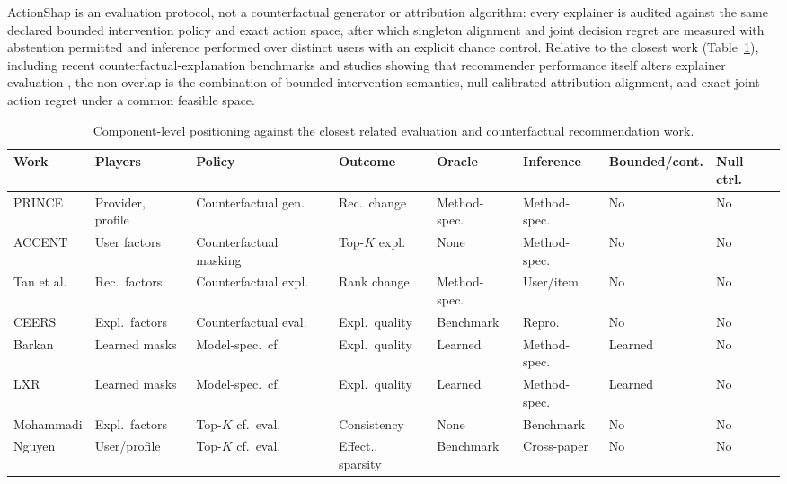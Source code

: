 \documentclass[pdflatex,sn-mathphys-num]{sn-jnl}
\theoremstyle{thmstyleone}
\theoremstyle{thmstyletwo}
\theoremstyle{thmstylethree}
\begin{document}
ActionShap is an evaluation protocol, not a counterfactual generator or attribution algorithm: every explainer is audited against the same declared bounded intervention policy and exact action space, after which singleton alignment and joint decision regret are measured with abstention permitted and inference performed over distinct users with an explicit chance control. Relative to the closest work (Table~\ref{tab:related-work-comparison}), including recent counterfactual-explanation benchmarks and studies showing that recommender performance itself alters explainer evaluation \cite{mohammadi2024recsys,nguyen2026}, the non-overlap is the combination of bounded intervention semantics, null-calibrated attribution alignment, and exact joint-action regret under a common feasible space.

\begin{table}[t]
\centering\scriptsize
\caption{Component-level positioning against the closest related evaluation and counterfactual recommendation work.}
\label{tab:related-work-comparison}
\begin{tabular}{@{}*{8}{>{\raggedright\arraybackslash}p{}}@{}}
\toprule
Work & Players & Policy & Outcome & Oracle & Inference & Bounded/cont. & Null ctrl. \\
\midrule
PRINCE \cite{ghazimatin2020} & Provider, profile & Counterfactual gen. & Rec.\ change & Method-spec. & Method-spec. & No & No \\
ACCENT \cite{tran2021} & User factors & Counterfactual masking & Top-$K$ expl. & None & Method-spec. & No & No \\
Tan et al. \cite{tan2021} & Rec.\ factors & Counterfactual expl. & Rank change & Method-spec. & User/item & No & No \\
CEERS \cite{baklanov2024} & Expl.\ factors & Counterfactual eval. & Expl.\ quality & Benchmark & Repro. & No & No \\
Barkan \cite{barkan2024} & Learned masks & Model-spec.\ cf. & Expl.\ quality & Learned & Method-spec. & Learned & No \\
LXR \cite{gurevitch2025} & Learned masks & Model-spec.\ cf. & Expl.\ quality & Learned & Method-spec. & Learned & No \\
Mohammadi \cite{mohammadi2025} & Expl.\ factors & Top-$K$ cf.\ eval. & Consistency & None & Benchmark & No & No \\
Nguyen \cite{nguyen2026} & User/profile & Top-$K$ cf.\ eval. & Effect., sparsity & Benchmark & Cross-paper & No & No \\

\end{tabular}
\end{table}
\end{document}
